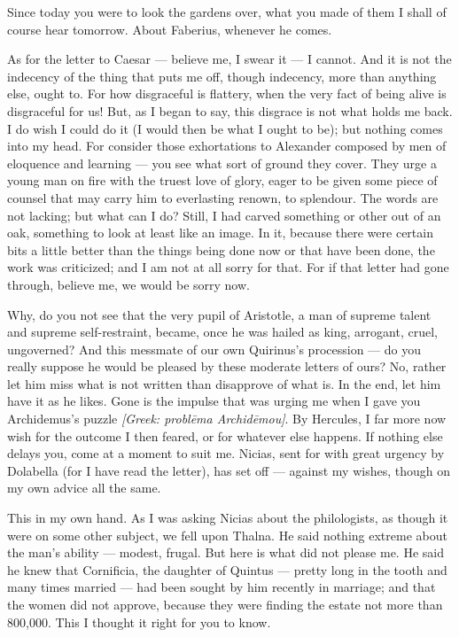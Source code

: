 

 Since today you were to look the gardens over, what you made of them I shall of course hear tomorrow. About Faberius, whenever he comes.

 As for the letter to Caesar --- believe me, I swear it --- I cannot. And it is not the indecency of the thing that puts me off, though indecency, more than anything else, ought to. For how disgraceful is flattery, when the very fact of being alive is disgraceful for us! But, as I began to say, this disgrace is not what holds me back. I do wish I could do it (I would then be what I ought to be); but nothing comes into my head. For consider those exhortations to Alexander composed by men of eloquence and learning --- you see what sort of ground they cover. They urge a young man on fire with the truest love of glory, eager to be given some piece of counsel that may carry him to everlasting renown, to splendour. The words are not lacking; but what can I do? Still, I had carved something or other out of an oak, something to look at least like an image. In it, because there were certain bits a little better than the things being done now or that have been done, the work was criticized; and I am not at all sorry for that. For if that letter had gone through, believe me, we would be sorry now.

 Why, do you not see that the very pupil of Aristotle, a man of supreme talent and supreme self-restraint, became, once he was hailed as king, arrogant, cruel, ungoverned? And this messmate of our own Quirinus's procession --- do you really suppose he would be pleased by these moderate letters of ours? No, rather let him miss what is not written than disapprove of what is. In the end, let him have it as he likes. Gone is the impulse that was urging me when I gave you Archidemus's puzzle \textit{[Greek: probl\=ema Archid\=emou]}. By Hercules, I far more now wish for the outcome I then feared, or for whatever else happens. If nothing else delays you, come at a moment to suit me. Nicias, sent for with great urgency by Dolabella (for I have read the letter), has set off --- against my wishes, though on my own advice all the same.

 This in my own hand. As I was asking Nicias about the philologists, as though it were on some other subject, we fell upon Thalna. He said nothing extreme about the man's ability --- modest, frugal. But here is what did not please me. He said he knew that Cornificia, the daughter of Quintus --- pretty long in the tooth and many times married --- had been sought by him recently in marriage; and that the women did not approve, because they were finding the estate not more than 800,000. This I thought it right for you to know.
